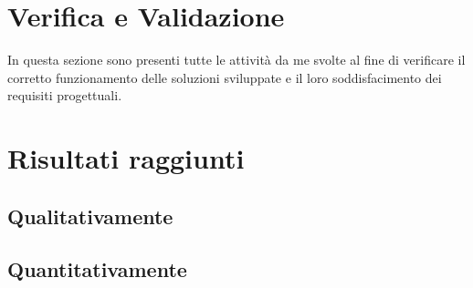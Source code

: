 \section{Verifica e Validazione}
In questa sezione sono presenti tutte le attività da me svolte al fine di verificare il corretto funzionamento delle soluzioni sviluppate e il loro soddisfacimento dei requisiti progettuali.

\section{Risultati raggiunti}
\subsection{Qualitativamente}
%

\subsection{Quantitativamente}
%

